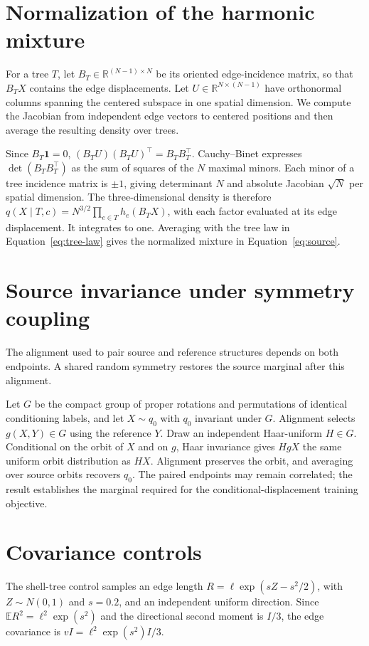 \documentclass{article}
\newcommand{\EE}{\mathbb E}
\newcommand{\RR}{\mathbb R}
\begin{document}
\section{Normalization of the harmonic mixture}\label{app:proof}
For a tree $T$, let $B_T\in\RR^{(N-1)\times N}$ be its oriented edge-incidence matrix, so that $B_TX$ contains the edge displacements. Let $U\in\RR^{N\times(N-1)}$ have orthonormal columns spanning the centered subspace in one spatial dimension. We compute the Jacobian from independent edge vectors to centered positions and then average the resulting density over trees.

Since $B_T\mathbf1=0$, $(B_TU)(B_TU)^\top=B_TB_T^\top$. Cauchy--Binet expresses $\det(B_TB_T^\top)$ as the sum of squares of the $N$ maximal minors. Each minor of a tree incidence matrix is $\pm1$, giving determinant $N$ and absolute Jacobian $\sqrt N$ per spatial dimension. The three-dimensional density is therefore $q(X\mid T,c)=N^{3/2}\prod_{e\in T}h_e(B_TX)$, with each factor evaluated at its edge displacement. It integrates to one. Averaging with the tree law in Equation~\eqref{eq:tree-law} gives the normalized mixture in Equation~\eqref{eq:source}.

\section{Source invariance under symmetry coupling}\label{app:symmetry}
The alignment used to pair source and reference structures depends on both endpoints. A shared random symmetry restores the source marginal after this alignment.

Let $G$ be the compact group of proper rotations and permutations of identical conditioning labels, and let $X\sim q_0$ with $q_0$ invariant under $G$. Alignment selects $g(X,Y)\in G$ using the reference $Y$. Draw an independent Haar-uniform $H\in G$. Conditional on the orbit of $X$ and on $g$, Haar invariance gives $HgX$ the same uniform orbit distribution as $HX$. Alignment preserves the orbit, and averaging over source orbits recovers $q_0$. The paired endpoints may remain correlated; the result establishes the marginal required for the conditional-displacement training objective.

\section{Covariance controls}
The shell-tree control samples an edge length $R=\ell\exp(sZ-s^2/2)$, with $Z\sim N(0,1)$ and $s=0.2$, and an independent uniform direction. Since $\EE R^2=\ell^2\exp(s^2)$ and the directional second moment is $I/3$, the edge covariance is $vI=\ell^2\exp(s^2)I/3$.
\end{document}
